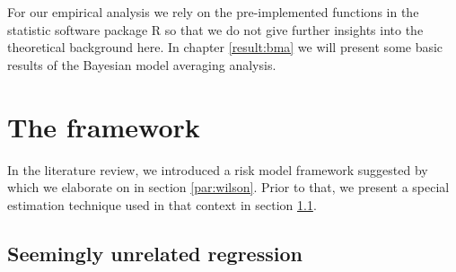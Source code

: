 \documentclass[a4paper, 11pt]{scrreprt}
\begin{document}
For our empirical analysis we rely on the pre-implemented functions in the statistic software package R so that we do not give further insights into the theoretical background here.
In chapter \ref{result:bma} we will present some basic results of the Bayesian model averaging analysis.


\section{The \textcite{wilson1997wilsonI} framework}\label{section:wilson}

In the literature review, we introduced a risk model framework suggested by \textcite{wilson1997wilsonI} which we elaborate on in section \ref{par:wilson}. Prior to that, we present a special estimation technique used in that context in section \ref{par:seemingly}. 

\subsection{Seemingly unrelated regression}\label{par:seemingly}
\end{document}
